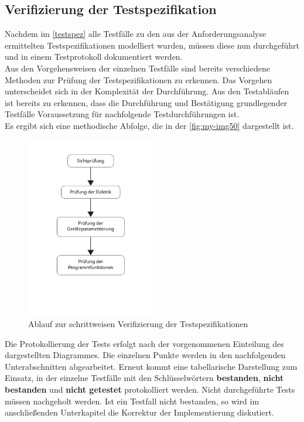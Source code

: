 \documentclass[../../../Bachelorarbeit.tex]{subfiles}
\begin{document}
\subsection{Verifizierung der Testspezifikation} \label{testpruef}
Nachdem im \autoref{testspez} alle Testfälle zu den aus der Anforderungsanalyse ermittelten Testspezifikationen modelliert wurden, müssen diese nun durchgeführt und in einem Testprotokoll dokumentiert werden.\\
Aus den Vorgehensweisen der einzelnen Testfälle sind bereits verschiedene Methoden zur Prüfung der Testspezifikationen zu erkennen. Das Vorgehen unterscheidet sich in der Komplexität der Durchführung. Aus den Testabläufen ist bereits zu erkennen, dass die Durchführung und Bestätigung grundlegender Testfälle Voraussetzung für nachfolgende Testdurchführungen ist. \\
Es ergibt sich eine methodische Abfolge, die in der \autoref{fig:my-img50} dargestellt ist.

\begin{figure}[H]
    \centering
    \includegraphics[width=0.5\textwidth]{Images/pruefablauf.pdf}
    \caption[Prüfablauf]{Ablauf zur schrittweisen Verifizierung der Testspezifikationen}
    \label{fig:my-img50}
\end{figure}

Die Protokollierung der Tests erfolgt nach der vorgenommenen Einteilung des dargestellten Diagrammes. Die einzelnen Punkte werden in den nachfolgenden Unterabschnitten abgearbeitet. Erneut kommt eine tabellarische Darstellung zum Einsatz, in der einzelne Testfälle mit den Schlüsselwörtern \textbf{bestanden}, \textbf{nicht bestanden} und \textbf{nicht getestet} protokolliert werden. Nicht durchgeführte Tests müssen nachgeholt werden. Ist ein Testfall nicht bestanden, so wird im anschließenden Unterkapitel die Korrektur der Implementierung diskutiert.
\end{document}
